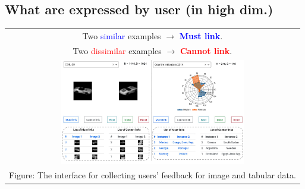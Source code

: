 \documentclass[portrait,final,a0paper]{nadiposter}
\begin{document}
\begin{poster}
{\begin{multicols}{2}
    \section*{\large{What are expressed by user (in high dim.)}}
    \begin{center}
    \begin{tabular}{c}
        Two \textcolor{blue}{similar} examples $\rightarrow$ \textcolor{blue}{\textbf{Must link}}.\\
        Two \textcolor{red}{dissimilar} examples $\rightarrow$ \textcolor{red}{\textbf{Cannot link}}. \\
        \includegraphics[height=12.5em]{poster_NADI_2018/images/app_guis_no_annotations.pdf}\\
        \tiny{Figure: The interface for collecting users' feedback for image and tabular data.}
    \end{tabular}
    \end{center}

\end{multicols}}
\end{poster}
\end{document}
